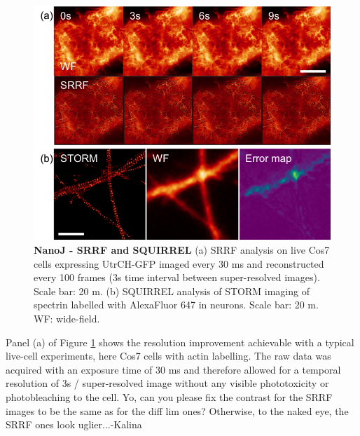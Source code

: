 \begin{figure}[!t]
    \centering
    \includegraphics[width=\linewidth]{Figures/Figure4_v1.png}
    \caption{\textbf{NanoJ - SRRF and SQUIRREL} (a) SRRF analysis on live Cos7 cells expressing UtrCH-GFP imaged every 30 ms and reconstructed every 100 frames (3s time interval between super-resolved images). Scale bar: 20 \textmu{}m. (b) SQUIRREL analysis of STORM imaging of spectrin labelled with AlexaFluor 647 in neurons. Scale bar: 20 \textmu{}m. WF: wide-field.}
    \label{fig:SRRF&SQUIRREL}
\end{figure}

Panel (a) of Figure \ref{fig:SRRF&SQUIRREL} shows the resolution improvement achievable with a typical live-cell experiments, here Cos7 cells with actin labelling. The raw data was acquired with an exposure time of 30 ms and therefore allowed for a temporal resolution of 3s / super-resolved image without any visible phototoxicity or photobleaching to the cell. Yo, can you please fix the contrast for the SRRF images to be the same as for the diff lim ones? Otherwise, to the naked eye, the SRRF ones look uglier...-Kalina


